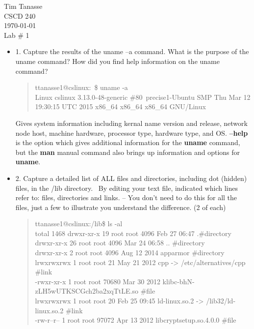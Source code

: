\documentclass{article}
\begin{document}
\begin{flushright}
  Tim Tanasse\\
  CSCD 240\\
  \today \\
  Lab \# 1 \\
\end{flushright}
\begin{itemize}
  \item 1. Capture the results of the uname –a command.  What is the purpose of the uname command?  How did you find help information on the uname command?\\
  \begin{quote}
    ttanasse1@cslinux:~\$ uname -a \\
    Linux cslinux 3.13.0-48-generic \#80~precise1-Ubuntu SMP Thu Mar 12 19:30:15 UTC 2015 x86\_64 x86\_64 x86\_64 GNU/Linux
  \end{quote}
Gives system information including kernal name version and release, network node host, machine hardware, processor type, hardware type, and OS. \textbf{--help} is the option which gives additional information for the \textbf{uname} command, but the \textbf{man} manual command also brings up information and options for \textbf{uname}.
  \item 2. Capture a detailed list of ALL files and directories, including dot (hidden) files, in the /lib directory.  By editing your text file, indicated which lines refer to: files, directories and links.  – You don’t need to do this for all the files, just a few to illustrate you understand the difference. (2 of each)
  \begin{quote}
    ttanasse1@cslinux:/lib\$ ls -al\\
total 1468
drwxr-xr-x 19 root root   4096 Feb 27 06:47 .\qquad\#directory\\
drwxr-xr-x 26 root root   4096 Mar 24 06:58 ..     \qquad\#directory\\
drwxr-xr-x  2 root root   4096 Aug 12  2014 apparmor     \qquad\#directory\\
lrwxrwxrwx  1 root root     21 May 21  2012 cpp -> /etc/alternatives/cpp   \qquad   \#link\\
-rwxr-xr-x  1 root root  70680 Mar 30  2012 klibc-bhN-zLH5wUTKSCGch2ba2xqTtLE.so  \qquad    \#file\\
lrwxrwxrwx  1 root root     20 Feb 25 09:45 ld-linux.so.2 -> /lib32/ld-linux.so.2    \qquad  \#link\\
-rw-r--r--  1 root root  97072 Apr 13  2012 libcryptsetup.so.4.0.0  \qquad   \#file

\end{quote}
\end{itemize}
\end{document}
